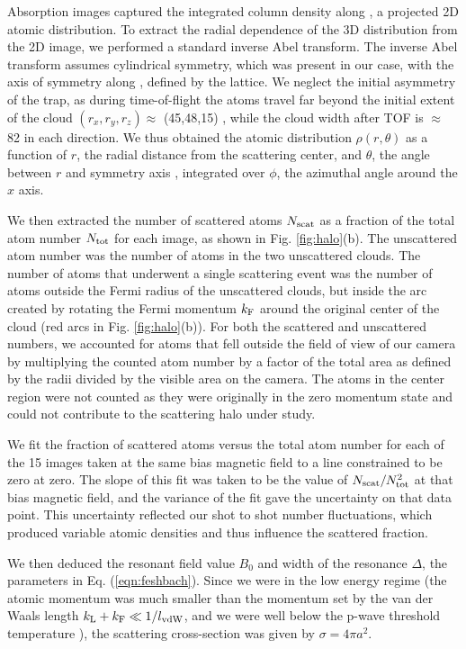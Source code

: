 Absorption images captured the integrated column density along \ez{}, a projected 2D atomic distribution. To extract the radial dependence of the 3D distribution from the 2D image, we performed a standard inverse Abel transform. The inverse Abel transform assumes cylindrical symmetry, which was present in our case, with the axis of symmetry along \ex{}, defined by the lattice. We neglect the initial asymmetry of the trap, as during time-of-flight the atoms travel far beyond the initial extent of the cloud  $(r_x,r_y,r_z)\approx$ (45,48,15) \um{}, while the cloud width after TOF is $\approx$ 82 \um in each direction. We thus obtained the atomic distribution $\rho(r,\theta)$ as a function of $r$, the radial distance from the scattering center, and $\theta$, the angle between $r$ and symmetry axis \ex{}, integrated over $\phi$, the azimuthal angle around the $x$ axis.

We then extracted the number of scattered atoms $N_{\rm{scat}}$ as a fraction of the total atom number $N_{\rm{tot}}$ for each image, as shown in Fig. \ref{fig:halo}(b). The unscattered atom number was the number of atoms in the two unscattered clouds. The number of atoms that underwent a single scattering event was the number of atoms outside the Fermi radius of the unscattered clouds, but inside the arc created by rotating the Fermi momentum $k_{\rm{F}}$ around the original center of the cloud (red arcs in Fig. \ref{fig:halo}(b)). For both the scattered and unscattered numbers, we accounted for atoms that fell outside the field of view of our camera by multiplying the counted atom number by a factor of the total area as defined by the radii divided by the visible area on the camera. The atoms in the center region were not counted as they were originally in the zero momentum state and could not contribute to the scattering halo under study.

We fit the fraction of scattered atoms versus the total atom number for each of the 15 images taken at the same bias magnetic field to a line constrained to be zero at zero. The slope of this fit was taken to be the value of $N_{\rm{scat}}/N_{\rm{tot}}^2$ at that bias magnetic field, and the variance of the fit gave the uncertainty on that data point. This uncertainty reflected our shot to shot number fluctuations, which produced variable atomic densities and thus influence the scattered fraction. 

We then deduced the resonant field value $B_0$ and width of the resonance  $\Delta$, the parameters in Eq. (\ref{eqn:feshbach}).  Since we were in the low energy regime (the atomic momentum was much smaller than the momentum set by the van der Waals length $k_{\rm{L}}+k_{\rm{F}}\ll1/l_{\rm{vdW}}$, and we were well below the p-wave threshold temperature \cite{DeMarco99}), the scattering cross-section was given by $\sigma=4\pi a^2$.

